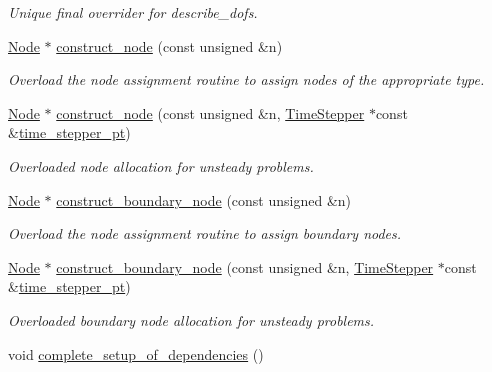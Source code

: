 \begin{DoxyCompactItemize}
\begin{DoxyCompactList}\small\item\em Unique final overrider for describe\+\_\+dofs. \end{DoxyCompactList}\item 
\hyperlink{classoomph_1_1Node}{Node} $\ast$ \hyperlink{classoomph_1_1ElementWithSpecificMovingNodes_a30518ed83666fd5d68380f9a91261a8f}{construct\+\_\+node} (const unsigned \&n)
\begin{DoxyCompactList}\small\item\em Overload the node assignment routine to assign nodes of the appropriate type. \end{DoxyCompactList}\item 
\hyperlink{classoomph_1_1Node}{Node} $\ast$ \hyperlink{classoomph_1_1ElementWithSpecificMovingNodes_aee8cdb8c967eb73fc0443c5812e41ceb}{construct\+\_\+node} (const unsigned \&n, \hyperlink{classoomph_1_1TimeStepper}{Time\+Stepper} $\ast$const \&\hyperlink{classoomph_1_1GeomObject_a3c92023891dd4a0e818022f467eeb7f1}{time\+\_\+stepper\+\_\+pt})
\begin{DoxyCompactList}\small\item\em Overloaded node allocation for unsteady problems. \end{DoxyCompactList}\item 
\hyperlink{classoomph_1_1Node}{Node} $\ast$ \hyperlink{classoomph_1_1ElementWithSpecificMovingNodes_ab14ba36aafcd7fad826cbb9f8c1eb718}{construct\+\_\+boundary\+\_\+node} (const unsigned \&n)
\begin{DoxyCompactList}\small\item\em Overload the node assignment routine to assign boundary nodes. \end{DoxyCompactList}\item 
\hyperlink{classoomph_1_1Node}{Node} $\ast$ \hyperlink{classoomph_1_1ElementWithSpecificMovingNodes_ad76d54eac2934b61bc99a4069c493484}{construct\+\_\+boundary\+\_\+node} (const unsigned \&n, \hyperlink{classoomph_1_1TimeStepper}{Time\+Stepper} $\ast$const \&\hyperlink{classoomph_1_1GeomObject_a3c92023891dd4a0e818022f467eeb7f1}{time\+\_\+stepper\+\_\+pt})
\begin{DoxyCompactList}\small\item\em Overloaded boundary node allocation for unsteady problems. \end{DoxyCompactList}\item 
void \hyperlink{classoomph_1_1ElementWithSpecificMovingNodes_ae54ee1d8772757d72d9df3e7229d8ecf}{complete\+\_\+setup\+\_\+of\+\_\+dependencies} ()

\end{DoxyCompactItemize}
